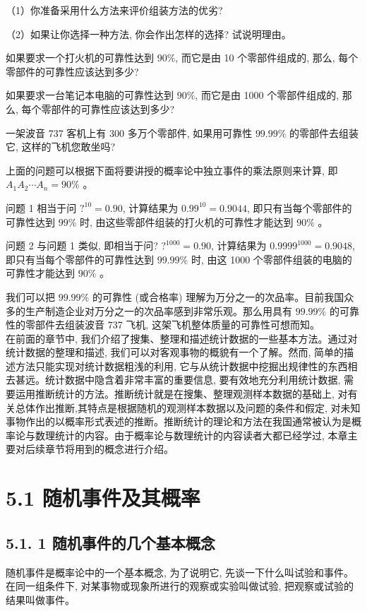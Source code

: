 \documentclass[10pt]{article}
\begin{document}
\begin{CJK*}{UTF8}{bsmi}
（1）你准备采用什么方法来评价组装方法的优劣?

（2）如果让你选择一种方法, 你会作出怎样的选择? 试说明理由。

\begin{center}
\end{center}

如果要求一个打火机的可靠性达到 $90 \%$, 而它是由 10 个零部件组成的, 那么, 每个零部件的可靠性应该达到多少?

如果要求一台笔记本电脑的可靠性达到 $90 \%$, 而它是由 1000 个零部件组成的, 那么, 每个零部件的可靠性应该达到多少?

一架波音 737 客机上有 300 多万个零部件, 如果用可靠性 $99.99 \%$ 的零部件去组装它, 这样的飞机您敢坐吗?

上面的问题可以根据下面将要讲授的概率论中独立事件的乘法原则来计算, 即 $A_{1} A_{2} \cdots A_{n}=90 \%$ 。

问题 1 相当于问 $?^{10}=0.90$, 计算结果为 $0.99^{10}=0.9044$, 即只有当每个零部件的可靠性达到 $99 \%$ 时, 由这些零部件组装的打火机的可靠性才能达到 $90 \%$ 。

问题 2 与问题 1 类似, 即相当于问? $?^{1000}=0.90$, 计算结果为 $0.9999^{1000}=0.9048$,即只有当每个零部件的可靠性达到 $99.99 \%$ 时, 由这 1000 个零部件组装的电脑的可靠性才能达到 $90 \%$ 。

我们可以把 $99.99 \%$ 的可靠性 (或合格率) 理解为万分之一的次品率。目前我国众多的生产制造企业对万分之一的次品率感到非常乐观。那么用具有 $99.99 \%$ 的可靠性的零部件去组装波音 737 飞机, 这架飞机整体质量的可靠性可想而知。\\
在前面的章节中, 我们介绍了搜集、整理和描述统计数据的一些基本方法。通过对统计数据的整理和描述, 我们可以对客观事物的概貌有一个了解。然而, 简单的描述方法只能实现对统计数据粗浅的利用, 它与从统计数据中挖掘出规律性的东西相去甚远。统计数据中隐含着非常丰富的重要信息, 要有效地充分利用统计数据, 需要运用推断统计的方法。推断统计就是在搜集、整理观测样本数据的基础上, 对有关总体作出推断,其特点是根据随机的观测样本数据以及问题的条件和假定, 对未知事物作出的以概率形式表述的推断。推断统计的理论和方法在我国通常被认为是概率论与数理统计的内容。由于概率论与数理统计的内容读者大都已经学过, 本章主要对后续章节将用到的概念进行介绍。

\section*{5.1 随机事件及其概率}
\subsection*{5.1. 1 随机事件的几个基本概念}
随机事件是概率论中的一个基本概念, 为了说明它, 先谈一下什么叫试验和事件。在同一组条件下, 对某事物或现象所进行的观察或实验叫做试验, 把观察或试验的结果叫做事件。


\end{CJK*}
\end{document}
